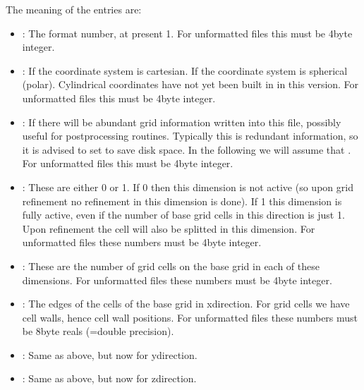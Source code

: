 \documentclass[letterpaper,10pt,english]{sphinxmanual}
\begin{document}
The meaning of the entries are:
\begin{itemize}
\item {} 
: The format number, at present 1. For
unformatted files this must be 4\sphinxhyphen{}byte integer.

\item {} 
: If  the coordinate system is
cartesian. If  the coordinate system is spherical
(polar). Cylindrical coordinates have not yet been built in in this
version. For unformatted files this must be 4\sphinxhyphen{}byte integer.

\item {} 
: If  there will be
abundant grid information written into this file, possibly useful for
post\sphinxhyphen{}processing routines. Typically this is redundant information, so it
is advised to set  to save disk space. In the
following we will assume that . For unformatted
files this must be 4\sphinxhyphen{}byte integer.

\item {} 
: These are either 0 or
1. If 0 then this dimension is not active (so upon grid refinement no
refinement in this dimension is done). If 1 this dimension is fully
active, even if the number of base grid cells in this direction is just
1. Upon refinement the cell will also be splitted in this dimension. For
unformatted files these numbers must be 4\sphinxhyphen{}byte integer.

\item {} 
: These are the number of grid cells on the
base grid in each of these dimensions. For unformatted files these numbers
must be 4\sphinxhyphen{}byte integer.

\item {} 
: The edges of the cells of the base grid in
x\sphinxhyphen{}direction. For  grid cells we have  cell walls, hence 
cell wall positions. For unformatted files these numbers must be 8\sphinxhyphen{}byte reals
(=double precision).

\item {} 
: Same as above, but now for
y\sphinxhyphen{}direction.

\item {} 
: Same as above, but now for
z\sphinxhyphen{}direction.

\end{itemize}
\end{document}
